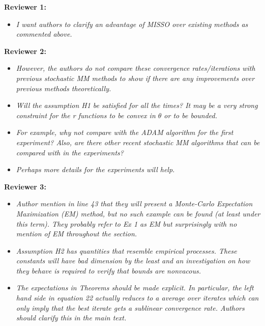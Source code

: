 \documentclass{article}
\begin{document}
\textbf{Reviewer 1:}
\begin{itemize}
\item \textit{I want authors to clarify an advantage of MISSO over existing methods as commented above.}
\end{itemize}
\textbf{Reviewer 2:}
\begin{itemize}
\item \textit{However, the authors do not compare these convergence rates/iterations with previous stochastic MM methods to show if there are any improvements over previous methods theoretically.}

\item \textit{Will the assumption H1 be satisfied for all the times? It may be a very strong constraint for the r functions to be convex in $\theta$ or to be bounded.}

\item \textit{For example, why not compare with the ADAM algorithm for the first experiment? Also, are there other recent stochastic MM algorithms that can be compared with in the experiments?}

\item \textit{ Perhaps more details for the experiments will help.}
\end{itemize}

\textbf{Reviewer 3:}
\begin{itemize}
\item \textit{Author mention in line 43 that they will present a Monte-Carlo Expectation Maximization (EM) method,
but no such example can be found (at least under this term). They probably refer to Ex 1 as EM but
surprisingly with no mention of EM throughout the section.}

\item \textit{Assumption H2 has quantities that resemble empirical processes. These constants will have bad dimension
by the least and an investigation on how they behave is required to verify that bounds are nonvacous.}

\item \textit{The expectations in Theorems should be made explicit. In particular, the left hand side in equation 22
actually reduces to a average over iterates which can only imply that the best iterate gets a sublinear
convergence rate. Authors should clarify this in the main text.}
\end{itemize}
\end{document}
